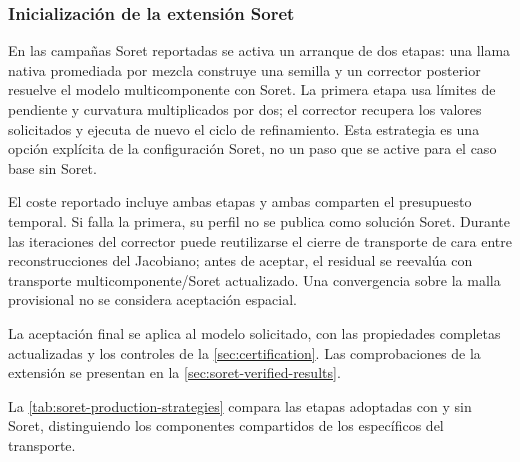 \documentclass[12pt,a4paper,twoside,openany]{book}
\begin{document}
\subsubsection{Inicialización de la extensión Soret}
En las campañas Soret reportadas se activa un arranque de dos etapas: una llama
nativa promediada por mezcla construye una semilla y un corrector posterior
resuelve el modelo multicomponente con Soret. La primera etapa usa límites de
pendiente y curvatura multiplicados por dos; el corrector recupera los valores
solicitados y ejecuta de nuevo el ciclo de refinamiento. Esta estrategia es una
opción explícita de la configuración Soret, no un paso que se active para el
caso base sin Soret.

El coste reportado incluye ambas etapas y ambas comparten el presupuesto
temporal. Si falla la primera, su perfil no se publica como solución Soret.
Durante las iteraciones del corrector puede reutilizarse el cierre de
transporte de cara entre reconstrucciones del Jacobiano; antes de aceptar, el
residual se reevalúa con transporte multicomponente/Soret actualizado. Una
convergencia sobre la malla provisional no se considera aceptación espacial.

La aceptación final se aplica al modelo solicitado, con las propiedades
completas actualizadas y los controles de la \cref{sec:certification}.
Las comprobaciones de la extensión se presentan en la
\cref{sec:soret-verified-results}.

La \cref{tab:soret-production-strategies} compara las etapas adoptadas con
y sin Soret, distinguiendo los componentes compartidos de los específicos del transporte.
\end{document}
